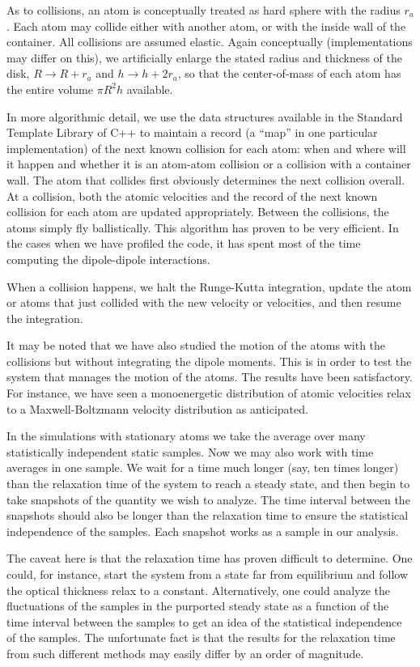As to collisions, an atom is conceptually treated as hard sphere with the radius $r_a$. Each atom may collide either with another atom, or with the inside wall of the container. All collisions are assumed elastic. Again conceptually (implementations may differ on this), we artificially enlarge the stated radius and thickness of the disk, 
$R\rightarrow R+r_a$ and $h\rightarrow h+2r_a$, so that the center-of-mass of each atom has the entire volume $\pi R^2h$ available.

In more algorithmic detail, we use the data structures available in the Standard Template Library of C++ to maintain a record (a ``map'' in one particular implementation) of the next known collision for each atom: when and where will it happen and whether it is an atom-atom collision or a collision with a container wall. The atom that collides first obviously determines the next collision overall. At a collision, both the atomic velocities and the record of the next known collision for each atom are updated appropriately. Between the collisions, the atoms simply fly ballistically. This algorithm has proven to be very efficient. In the cases when we have profiled the code, it has spent most of the time computing the dipole-dipole interactions.

When a collision happens, we halt the Runge-Kutta integration, update the atom or atoms that just collided with the new velocity or velocities, and then resume the integration.

It may be noted that we have also studied the motion of the atoms with the collisions but without integrating the dipole moments. This is in order to test the system that manages the motion of the atoms. The results have been satisfactory. For instance, we have seen a monoenergetic distribution of atomic velocities relax to a Maxwell-Boltzmann velocity distribution as anticipated.

In the simulations with stationary atoms we take the average over many statistically independent static samples. Now we may also work with time averages in one sample.  We wait for a time much longer (say, ten times longer) than the relaxation time of the system to reach a steady state, and then begin to take snapshots of the quantity we wish to analyze. The time interval between the snapshots should also be longer than the relaxation time to ensure the statistical independence of the samples. Each snapshot works as a sample in our analysis. 

The caveat here is that the relaxation time has proven difficult to determine. One could, for instance, start the system from a state far from equilibrium and follow the optical thickness relax to a constant. Alternatively, one could analyze the fluctuations of the samples in the purported steady state as a function of the time interval between the samples to get an idea of the statistical independence of the samples. The unfortunate fact is that the results for the relaxation time from such different methods may easily differ by an order of magnitude.

